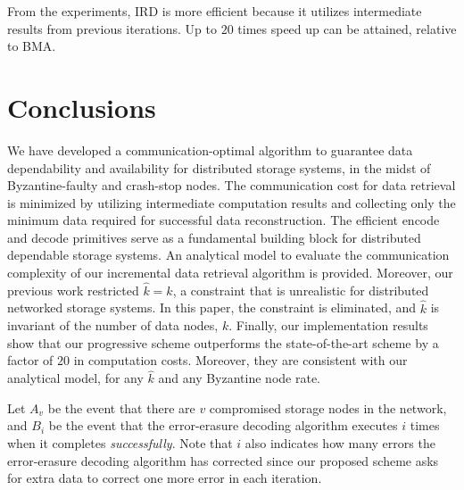 \documentclass[10pt,journal,letterpaper,compsoc]{IEEEtran}
\newcommand{\0}{{\bf 0}}
\begin{document}
From the experiments, IRD is more efficient because it utilizes intermediate results from
previous iterations. Up to $20$ times speed up can be attained, relative to
BMA.
\begin{comment}
Also, the computation complexity in
Section~\ref{sect:complexity} only provides the worst-case order analysis. In
practice, the computation time in the average case can differ significantly in
part due to hidden constant factors.
\end{comment}
\section{Conclusions}
\label{sect:conc}
\vspace{-0.25em}
We have developed a communication-optimal algorithm to guarantee data dependability 
and availability for distributed storage systems, in the midst of Byzantine-faulty and crash-stop nodes.
The communication cost for data retrieval is minimized by utilizing intermediate computation 
results and collecting only the minimum data required 
for successful data reconstruction. The efficient encode and decode
primitives serve as a fundamental building block for distributed dependable
storage systems. An analytical model to evaluate the communication complexity of our incremental data retrieval algorithm is provided.
Moreover, our previous work restricted 
$\hat{k}=k$, a constraint that is unrealistic for distributed networked storage systems. In this paper, the constraint is eliminated, and 
$\hat{k}$ is invariant of the number of data nodes, $k$. Finally, our implementation
results show that our progressive scheme outperforms the state-of-the-art scheme by a factor of $20$ in computation costs.
Moreover, they are consistent with our analytical model, for any $\hat{k}$ and any
Byzantine node rate.
\begin{comment}
The proposed scheme guarantees latency of real time applications by collecting data in each data retrieval, according to the probability that a storage node is Byzantine. Our scheme is desirable for real-time systems, where energy minimization in communication is critical. Our scheme is also desirable under high data rates as it minimizes communication costs by retrieving only necessary symbols. 
\end{comment}
\label{app:proof}
Let $A_v$ be the event that there are $v$ compromised
storage nodes in the network, and $B_i$ be the event that the error-erasure
decoding algorithm  executes $i$ times when it completes {\it successfully}.
Note that $i$ also indicates how many errors the error-erasure decoding
algorithm has corrected since our proposed scheme asks for extra data to
correct one more error in each iteration.  
\end{document}
